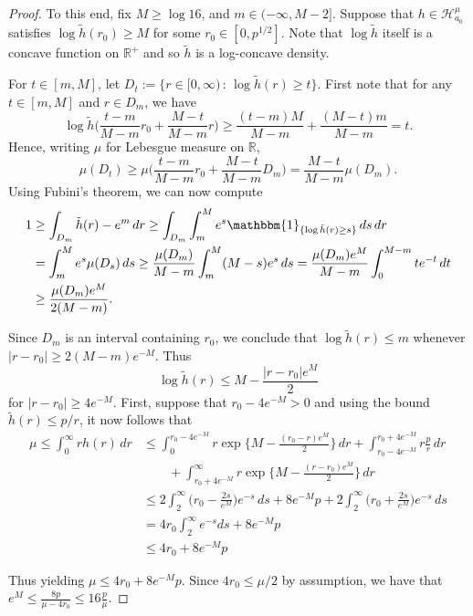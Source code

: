 \documentclass[12pt]{article}
\begin{document}
\begin{proof}
  To this end, fix $M \geq \log 16$, and $m \in (-\infty,M-2]$.  Suppose that $h \in \mathcal{H}_{a_0}^\mu$ satisfies $\log \tilde{h}(r_0) \geq M$ for some $r_0 \in [0 ,p^{1/2}]$. Note that $\log \tilde{h}$ itself is a concave function on $\mathbb{R}^+$ and so $\tilde{h}$ is a log-concave density.

  For $t \in [m,M]$, let $D_t := \{r \in [0,\infty) \,:\, \log \tilde{h}(r) \geq t\}$.  First note that for any $t \in [m,M]$ and $r \in D_m$, we have
\[
\log \tilde{h} \biggl(\frac{t-m}{M-m}r_0 + \frac{M-t}{M-m}r\biggr) \geq \frac{(t-m)M}{M-m} + \frac{(M-t)m}{M-m} = t.
\]
Hence, writing $\mu$ for Lebesgue measure on $\mathbb{R}$,
\[
\mu(D_t) \geq \mu\biggl(\frac{t-m}{M-m}r_0 + \frac{M-t}{M-m}D_m\biggr) = \frac{M-t}{M-m}\mu(D_m).
\]
Using Fubini's theorem, we can now compute
\begin{align*}
1 &\geq \int_{D_m} \tilde{h}(r) - e^m \, dr \geq \int_{D_m} \int_m^M e^s \mathbbm{1}_{\{\log \tilde{h}(r) \geq s\}} \, ds \, dr \\
&= \int_m^M e^s \mu(D_s) \, ds \geq \frac{\mu(D_m)}{M-m}\int_m^M (M-s)e^s \, ds = \frac{\mu(D_m)e^M}{M-m}\int_0^{M-m} te^{-t} \, dt \\
&\geq \frac{\mu(D_m)e^M}{2(M-m)}.
\end{align*}                

Since $D_m$ is an interval containing $r_0$, we conclude that $\log \tilde{h}(r) \leq m$ whenever $|r-r_0| \geq 2(M-m)e^{-M}$.  Thus
\[
\log \tilde{h}(r) \leq M - \frac{|r-r_0|e^M}{2}
\]
for $|r-r_0| \geq 4e^{-M}$.  First, suppose that $r_0 - 4e^{-M} > 0$ and using the bound $\tilde{h}(r) \leq p/r$, it now follows that
\begin{align*}
\mu \leq \int_0^\infty r h(r) \, dr &\leq \int_0^{r_0 - 4e^{-M}} r \exp\biggl\{M - \frac{(r_0-r)e^M}{2}\biggr\} \, dr + \int_{r_0 - 4e^{-M}}^{r_0 + 4e^{-M}} r \frac{p}{r} \, dr \\
&\qquad + \int_{r_0 + 4e^{-M}}^\infty r \exp\biggl\{M - \frac{(r-r_0)e^M}{2}\biggr\} \, dr \\
                                    &\leq 2\int_2^\infty \biggl(r_0 - \frac{2s}{e^M}\biggr) e^{-s} \, ds + 8e^{-M} p + 2\int_2^\infty \biggl(r_0 + \frac{2s}{e^M}\biggr) e^{-s} \, ds \\
                                    & = 4 r_0 \int_2^\infty e^{-s} ds + 8 e^{-M} p \\
  &\leq 4 r_0 + 8 e^{-M} p
\end{align*}

Thus yielding $\mu \leq 4 r_0 + 8 e^{-M} p$. Since $4r_0 \leq \mu/2$ by assumption, we have that $e^M \leq \frac{8p}{\mu - 4 r_0} \leq 16 \frac{p}{\mu}$. 


\end{proof}
\end{document}
